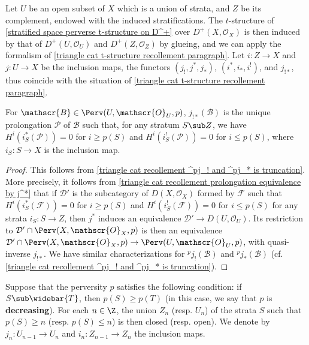 \begin{remark}
Let $U$ be an open subset of $X$ which is a union of strata, and $Z$ be its complement, endowed with the induced stratifications. The $t$-structure of \cref{stratified space perverse t-structure on D^+} over $D^+(X,\mathscr{O}_X)$ is then induced by that of $D^+(U,\mathscr{O}_U)$ and $D^+(Z,\mathscr{O}_Z)$ by glueing, and we can apply the formalism of \ref{triangle cat t-structure recollement paragraph}. Let $i:Z\to X$ and $j:U\to X$ be the inclusion maps, the functors $(j_!,j^*,j_*)$, $(i^*,i_*,i^!)$, and $j_{!*}$, thus coincide with the situation of \ref{triangle cat t-structure recollement paragraph}.
\end{remark}

\begin{proposition}\label{stratified space perverse t-structure j_!* prolongation char}
For $\mathscr{B}\in\Perv(U,\mathscr{O}_U,p)$, $j_{!*}(\mathscr{B})$ is the unique prolongation $\mathscr{P}$ of $\mathscr{B}$ such that, for any stratum $S\sub Z$, we have $H^i(i_S^*(\mathscr{P}))=0$ for $i\geq p(S)$ and $H^i(i_S^!(\mathscr{P}))=0$ for $i\leq p(S)$, where $i_S:S\to X$ is the inclusion map.
\end{proposition}
\begin{proof}
This follows from \cref{triangle cat recollement ^pj_! and ^pj_* is truncation}. More precisely, it follows from \cref{triangle cat recollement prolongation equivalence by j^*} that if $\mathcal{D}'$ is the  subcategory of $D(X,\mathscr{O}_X)$ formed by $\mathscr{F}$ such that $H^i(i_S^*(\mathscr{F}))=0$ for $i\geq p(S)$ and $H^i(i_S^!(\mathscr{F}))=0$ for $i\leq p(S)$ for any strata $i_S:S\to Z$, then $j^*$ induces an equivalence $\mathcal{D}'\to D(U,\mathscr{O}_U)$. Its restriction to $\mathcal{D}'\cap\Perv(X,\mathscr{O}_X,p)$ is then an equivalence $\mathcal{D}'\cap\Perv(X,\mathscr{O}_X,p)\to \Perv(U,\mathscr{O}_U,p)$, with quasi-inverse $j_{!*}$. We have similar characterizations for ${^p\!j_!}(\mathscr{B})$ and ${^p\!j_*}(\mathscr{B})$ (cf. \cref{triangle cat recollement ^pj_! and ^pj_* is truncation}).
\end{proof}

Suppose that the perversity $p$ satisfies the following condition: if $S\sub\widebar{T}$, then $p(S)\geq p(T)$ (in this case, we say that $p$ is \textbf{decreasing}). For each $n\in\Z$, the union $Z_n$ (resp. $U_n$) of the strata $S$ such that $p(S)\geq n$ (resp. $p(S)\leq n$) is then closed (resp. open). We denote by $j_n:U_{n-1}\to U_n$ and $i_n:Z_{n-1}\to Z_n$ the inclusion maps.

